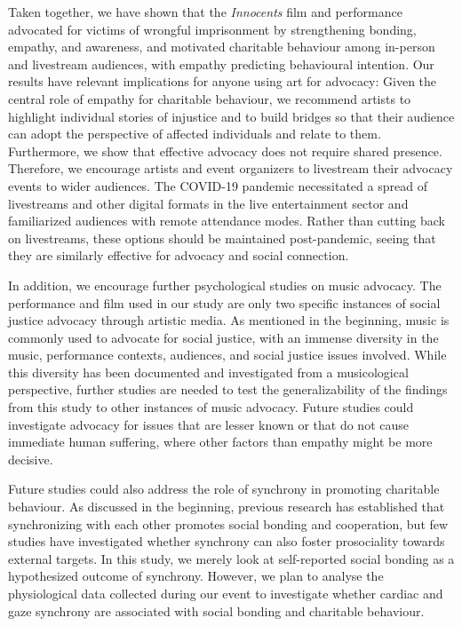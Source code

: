 \documentclass[
  man,floatsintext]{apa6}
\begin{document}
Taken together, we have shown that the \textit{Innocents} film and performance advocated for victims of wrongful imprisonment by strengthening bonding, empathy, and awareness, and motivated charitable behaviour among in-person and livestream audiences, with empathy predicting behavioural intention. Our results have relevant implications for anyone using art for advocacy: Given the central role of empathy for charitable behaviour, we recommend artists to highlight individual stories of injustice and to build bridges so that their audience can adopt the perspective of affected individuals and relate to them. Furthermore, we show that effective advocacy does not require shared presence. Therefore, we encourage artists and event organizers to livestream their advocacy events to wider audiences. The COVID-19 pandemic necessitated a spread of livestreams and other digital formats in the live entertainment sector and familiarized audiences with remote attendance modes. Rather than cutting back on livestreams, these options should be maintained post-pandemic, seeing that they are similarly effective for advocacy and social connection.

In addition, we encourage further psychological studies on music advocacy. The performance and film used in our study are only two specific instances of social justice advocacy through artistic media. As mentioned in the beginning, music is commonly used to advocate for social justice, with an immense diversity in the music, performance contexts, audiences, and social justice issues involved. While this diversity has been documented and investigated from a musicological perspective, further studies are needed to test the generalizability of the findings from this study to other instances of music advocacy. Future studies could investigate advocacy for issues that are lesser known or that do not cause immediate human suffering, where other factors than empathy might be more decisive.

Future studies could also address the role of synchrony in promoting charitable behaviour. As discussed in the beginning, previous research has established that synchronizing with each other promotes social bonding and cooperation, but few studies have investigated whether synchrony can also foster prosociality towards external targets. In this study, we merely look at self-reported social bonding as a hypothesized outcome of synchrony. However, we plan to analyse the physiological data collected during our event to investigate whether cardiac and gaze synchrony are associated with social bonding and charitable behaviour.
\end{document}
